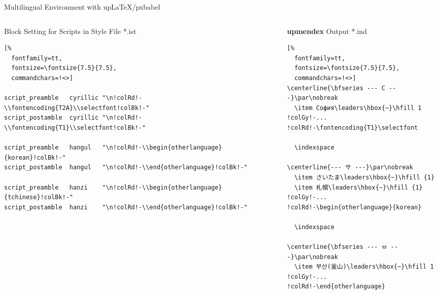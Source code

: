 \documentclass[aspectratio=169,10pt]{beamer}
\begin{document}
\setmonofont{Noto Sans Mono CJK JP}
\begin{frame}[fragile]{Multilingual Environment with upLaTeX/pxbabel}
\begin{columns}
\begin{column}{83mm}
\begin{exampleblock}{Block Setting for Scripts in Style File *.ist}
\makeatletter
\def\verbatim@font{\fontsize{7.5}{7.5}\selectfont\textjapanese}
\makeatother
\begin{Verbatim}[%
  fontfamily=tt,
  fontsize=\fontsize{7.5}{7.5},
  commandchars=!<>]

script_preamble   cyrillic "\n!colRd!-\\fontencoding{T2A}\\selectfont!colBk!-"
script_postamble  cyrillic "\n!colRd!-\\fontencoding{T1}\\selectfont!colBk!-"

script_preamble   hangul   "\n!colRd!-\\begin{otherlanguage}{korean}!colBk!-"
script_postamble  hangul   "\n!colRd!-\\end{otherlanguage}!colBk!-"

script_preamble   hanzi    "\n!colRd!-\\begin{otherlanguage}{tchinese}!colBk!-"
script_postamble  hanzi    "\n!colRd!-\\end{otherlanguage}!colBk!-"

\end{Verbatim}
\end{exampleblock}
\end{column}
\begin{column}{60mm}
\begin{exampleblock}{\textbf{upmendex} Output *.ind}
\begin{Verbatim}[%
  fontfamily=tt,
  fontsize=\fontsize{7.5}{7.5},
  commandchars=!<>]
\centerline{\bfseries --- С ---}\par\nobreak
  \item София\leaders\hbox{~}\hfill 1
!colGy!-...
!colRd!-\fontencoding{T1}\selectfont

  \indexspace

\centerline{--- サ ---}\par\nobreak
  \item さいたま\leaders\hbox{~}\hfill {1}
  \item 札幌\leaders\hbox{~}\hfill {1}
!colGy!-...
!colRd!-\begin{otherlanguage}{korean}

  \indexspace

\centerline{\bfseries --- ㅂ ---}\par\nobreak
  \item 부산(釜山)\leaders\hbox{~}\hfill 1
!colGy!-...
!colRd!-\end{otherlanguage}
\end{Verbatim}
\end{exampleblock}
\end{column}
\end{columns}

\end{frame}
\end{document}
